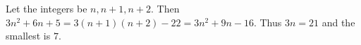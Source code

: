 Let the integers be $n,n+1,n+2$. Then $3n^2+6n+5=3(n+1)(n+2)-22=3n^2+9n-16$. Thus $3n=21$ and the smallest is $\boxed7$.
